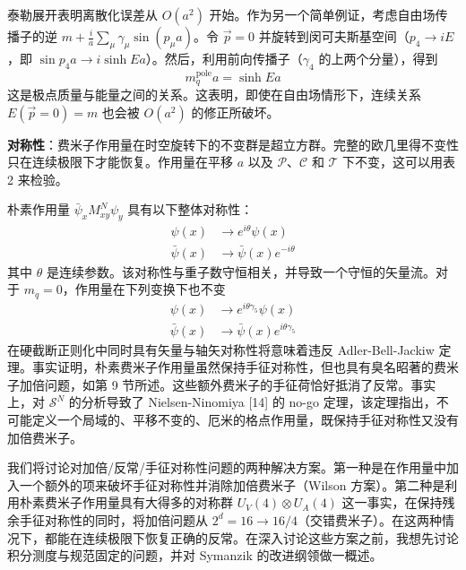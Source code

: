 泰勒展开表明离散化误差从 $O(a^2)$ 开始。作为另一个简单例证，考虑自由场传播子的逆 $m + \frac{i}{a}\sum_\mu\gamma_\mu\sin(p_\mu a)$。令 $\vec{p}=0$ 并旋转到闵可夫斯基空间（$p_4 \to iE$，即 $\sin p_4 a \to i\sinh Ea$）。然后，利用前向传播子（$\gamma_4$ 的上两个分量），得到
\begin{equation}
\label{eq:Npolemass}
m_q^{\mathrm{pole}} a = \sinh Ea
\end{equation}
这是极点质量与能量之间的关系。这表明，即使在自由场情形下，连续关系 $E(\vec{p}=0) = m$ 也会被 $O(a^2)$ 的修正所破坏。

\noindent\textbf{对称性}：费米子作用量在时空旋转下的不变群是超立方群。完整的欧几里得不变性只在连续极限下才能恢复。作用量在平移 $a$ 以及 $\mathcal{P}$、$\mathcal{C}$ 和 $\mathcal{T}$ 下不变，这可以用表 2 来检验。

朴素作用量 $\bar\psi_x M_{xy}^N\psi_y$ 具有以下整体对称性：
\begin{equation}
\label{eq:vector_psi}
\begin{aligned}
\psi(x) &\to e^{i\theta}\psi(x) \\
\bar\psi(x) &\to \bar\psi(x)e^{-i\theta}
\end{aligned}
\end{equation}
其中 $\theta$ 是连续参数。该对称性与重子数守恒相关，并导致一个守恒的矢量流。对于 $m_q = 0$，作用量在下列变换下也不变
\begin{equation}
\label{eq:axial_psi}
\begin{aligned}
\psi(x) &\to e^{i\theta\gamma_5}\psi(x) \\
\bar\psi(x) &\to \bar\psi(x)e^{i\theta\gamma_5}
\end{aligned}
\end{equation}
在硬截断正则化中同时具有矢量与轴矢对称性将意味着违反 Adler-Bell-Jackiw 定理。事实证明，朴素费米子作用量虽然保持手征对称性，但也具有臭名昭著的费米子加倍问题，如第 9 节所述。这些额外费米子的手征荷恰好抵消了反常。事实上，对 $\mathcal{S}^N$ 的分析导致了 Nielsen-Ninomiya [14] 的 no-go 定理，该定理指出，不可能定义一个局域的、平移不变的、厄米的格点作用量，既保持手征对称性又没有加倍费米子。

我们将讨论对加倍/反常/手征对称性问题的两种解决方案。第一种是在作用量中加入一个额外的项来破坏手征对称性并消除加倍费米子（Wilson 方案）。第二种是利用朴素费米子作用量具有大得多的对称群 $U_V(4)\otimes U_A(4)$ 这一事实，在保持残余手征对称性的同时，将加倍问题从 $2^d = 16 \to 16/4$（交错费米子）。在这两种情况下，都能在连续极限下恢复正确的反常。在深入讨论这些方案之前，我想先讨论积分测度与规范固定的问题，并对 Symanzik 的改进纲领做一概述。


